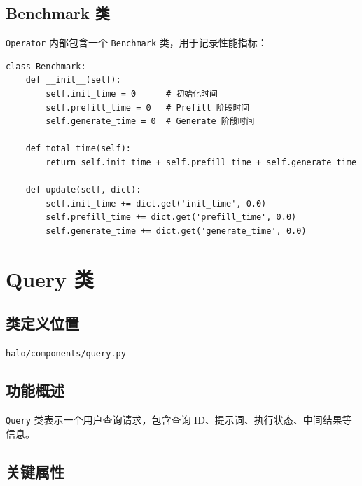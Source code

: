 \documentclass[12pt,a4paper]{article}
\begin{document}
\subsection{Benchmark 类}

\texttt{Operator} 内部包含一个 \texttt{Benchmark} 类，用于记录性能指标：

\begin{lstlisting}
class Benchmark:
    def __init__(self):
        self.init_time = 0      # 初始化时间
        self.prefill_time = 0   # Prefill 阶段时间
        self.generate_time = 0  # Generate 阶段时间
    
    def total_time(self):
        return self.init_time + self.prefill_time + self.generate_time
    
    def update(self, dict):
        self.init_time += dict.get('init_time', 0.0)
        self.prefill_time += dict.get('prefill_time', 0.0)
        self.generate_time += dict.get('generate_time', 0.0)
\end{lstlisting}

\section{Query 类}

\subsection{类定义位置}
\texttt{halo/components/query.py}

\subsection{功能概述}
\texttt{Query} 类表示一个用户查询请求，包含查询 ID、提示词、执行状态、中间结果等信息。

\subsection{关键属性}
\end{document}
